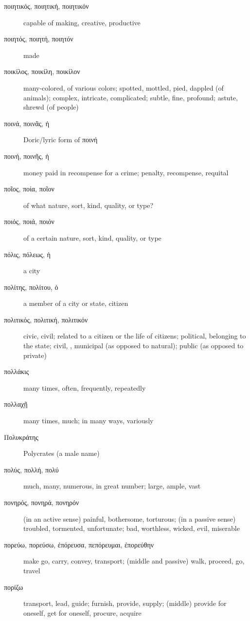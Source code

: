 \documentclass[12pt,letterpaper]{article}
\begin{document}
\begin{description}
    \item[\textgreek{ποιητικός, ποιητική, ποιητικόν}] capable of making, creative, productive
    \item[\textgreek{ποιητός, ποιητή, ποιητόν}] made
    \item[\textgreek{ποικίλος, ποικίλη, ποικίλον}] many-colored, of various colors; spotted, mottled, pied, dappled (of animals); complex, intricate, complicated; subtle, fine, profound; astute, shrewd (of people)
    \item[\textgreek{ποινά, ποινᾶς, ἡ}] Doric/lyric form of ποινή
    \item[\textgreek{ποινή, ποινῆς, ἡ}] money paid in recompense for a crime; penalty, recompense, requital
    \item[\textgreek{ποῖος, ποία, ποῖον}] \marginnote{*}of what nature, sort, kind, quality, or type?
    \item[\textgreek{ποιός, ποιά, ποιόν}] of a certain nature, sort, kind, quality, or type
    \item[\textgreek{πόλις, πόλεως, ἡ}] \marginnote{*}a city
    \item[\textgreek{πολίτης, πολίτου, ὁ}] a member of a city or state, citizen
    \item[\textgreek{πολιτικός, πολιτική, πολιτικόν}] civic, civil; related to a citizen or the life of citizens; political, belonging to the state; civil, , municipal (as opposed to natural); public (as opposed to private)
    \item[\textgreek{πολλάκις}] \marginnote{*}many times, often, frequently, repeatedly
    \item[\textgreek{πολλαχῇ}] many times, much; in many ways, variously
    \item[\textgreek{Πολυκράτης}] Polycrates (a male name)
    \item[\textgreek{πολύς, πολλή, πολύ}] \marginnote{*}much, many, numerous, in great number; large, ample, vast
    \item[\textgreek{πονηρός, πονηρά, πονηρόν}] \marginnote{*}(in an active sense) painful, bothersome, torturous; (in a passive sense) troubled, tormented, unfortunate; bad, worthless, wicked, evil, miserable
    \item[\textgreek{πορεύω, πορεύσω, ἐπόρευσα, πεπόρευμαι, ἐπορεύθην}] \marginnote{*}make go, carry, convey, transport; (middle and passive) walk, proceed, go, travel
    \item[\textgreek{πορίζω}] transport, lead, guide; furnish, provide, supply; (middle) provide for oneself, get for oneself, procure, acquire

\end{description}
\end{document}
